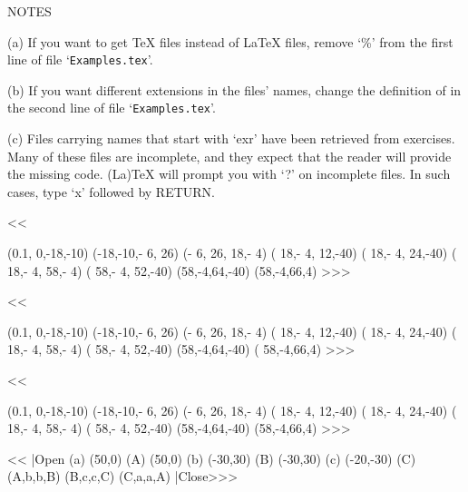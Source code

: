 {\noindent NOTES

(a) If you want to get TeX files instead of LaTeX files, remove `\%'
from the first line of file `{\tt Examples.tex}'.%


(b) If you want different extensions in the files' names, 
change the definition of {\tt\string\ext} in the second line 
of file `{\tt Examples.tex}'.%

(c) Files carrying names that start with `exr' have been retrieved
from exercises. Many of these files are incomplete, and they expect
that the reader will provide the missing code. (La)TeX will prompt you
with `?' on incomplete files. In such cases, type `x' followed by
RETURN.

\bigskip  {}   \def\files{\fileD}


\<<<

\Draw
   \LineAt(0.1,  0,-18,-10)
   \LineAt(-18,-10,- 6, 26)
   \LineAt(- 6, 26, 18,- 4)
   \LineAt( 18,- 4, 12,-40)
   \LineAt( 18,- 4, 24,-40)
   \LineAt( 18,- 4, 58,- 4)
   \LineAt( 58,- 4, 52,-40) 
   \LineAt(58,-4,64,-40) \LineAt(58,-4,66,4)
\EndDraw
\bye >>>


\<<<
  

\Draw
   \LineAt(0.1,  0,-18,-10)
   \LineAt(-18,-10,- 6, 26)
   \LineAt(- 6, 26, 18,- 4)
   \LineAt( 18,- 4, 12,-40)
   \LineAt( 18,- 4, 24,-40)
   \LineAt( 18,- 4, 58,- 4)
   \LineAt( 58,- 4, 52,-40) 
   \LineAt(58,-4,64,-40) \LineAt( 58,-4,66,4)
\EndDraw
>>>



\<<<

\Draw
   \LineAt(0.1,  0,-18,-10)
   \LineAt(-18,-10,- 6, 26)
   \LineAt(- 6, 26, 18,- 4)
   \LineAt( 18,- 4, 12,-40)
   \LineAt( 18,- 4, 24,-40)
   \LineAt( 18,- 4, 58,- 4)
   \LineAt( 58,- 4, 52,-40) 
   \LineAt(58,-4,64,-40) \LineAt(58,-4,66,4)
\EndDraw
>>>




\<<<
|Open 
   \MarkLoc(a)    \Move(50,0)  
   \MarkLoc(A)    \Move(50,0)    
   \MarkLoc(b)    \Move(-30,30) 
   \MarkLoc(B)    \Move(-30,30)
   \MarkLoc(c)    \Move(-20,-30) 
   \MarkLoc(C)    
   \Curve(A,b,b,B) 
   \Curve(B,c,c,C) 
   \Curve(C,a,a,A)
|Close>>>


}
